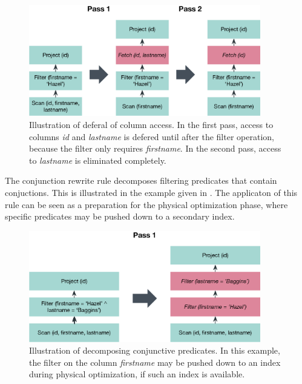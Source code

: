 \begin{figure}[bt]
    \centering
    \includegraphics[width=0.9\textwidth]{figures/logical-rule-fetch}
    \caption{Illustration of deferal of column access. In the first pass, access to columns \emph{id} and \emph{lastname} is defered until after the filter operation, because the filter only requires \emph{firstname}. In the second pass, access to \emph{lastname} is eliminated completely.}
    \label{figure:cottontail_logical_rule_fetch}
\end{figure}

The conjunction rewrite rule decomposes filtering predicates that contain conjuctions. This is illustrated in the example given in . The applicaton of this rule can be seen as a preparation for the physical optimization phase, where specific predicates may be pushed down to a secondary index.

\begin{figure}[bt]
    \centering
    \includegraphics[width=0.9\textwidth]{figures/logical-rule-conjunction}
    \caption{Illustration of decomposing conjunctive predicates. In this example, the filter on the column \emph{firstname} may be pushed down to an index during physical optimization, if such an index is available.}
    \label{figure:cottontail_logical_rule_conjunction}
\end{figure}

